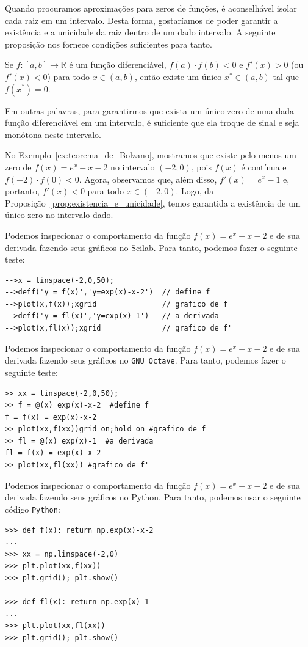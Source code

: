Quando procuramos aproximações para zeros de funções, é aconselhável isolar cada raiz em um intervalo. Desta forma, gostaríamos de poder garantir a existência e a unicidade da raiz dentro de um dado intervalo. A seguinte proposição nos fornece condições suficientes para tanto.

\begin{prop}\label{prop:existencia_e_unicidade}
Se $f:[a, b]\to\mathbb{R}$ é um função diferenciável, $f(a)\cdot f(b)<0$ e $f'(x)>0$ (ou $f'(x)<0$) para todo $x\in(a, b)$, então existe um único $x^*\in (a, b)$ tal que $f(x^*) = 0$.
\end{prop}

Em outras palavras, para garantirmos que exista um único zero de uma dada função diferenciável em um intervalo, é suficiente que ela troque de sinal e seja monótona neste intervalo.

\begin{ex}
No Exemplo~\ref{ex:teorema_de_Bolzano}, mostramos que existe pelo menos um zero de $f(x) = e^{x}-x-2$ no intervalo $(-2,0)$, pois $f(x)$ é contínua e $f(-2)\cdot f(0) < 0$. Agora, observamos que, além disso, $f'(x)=e^x-1$ e, portanto, $f'(x) < 0$ para todo $x\in(-2,0)$. Logo, da Proposição~\ref{prop:existencia_e_unicidade}, temos garantida a existência de um único zero no intervalo dado.

\ifisscilab
Podemos inspecionar o comportamento da função $f(x)= e^x - x - 2$ e de sua derivada fazendo seus gráficos no Scilab. Para tanto, podemos fazer o seguinte teste:
\begin{verbatim}
-->x = linspace(-2,0,50);
-->deff('y = f(x)','y=exp(x)-x-2')  // define f
-->plot(x,f(x));xgrid               // grafico de f
-->deff('y = fl(x)','y=exp(x)-1')   // a derivada
-->plot(x,fl(x));xgrid              // grafico de f'
\end{verbatim}
\fi
\ifisoctave
Podemos inspecionar o comportamento da função $f(x)= e^x - x - 2$ e de sua derivada fazendo seus gráficos no \verb+GNU Octave+. Para tanto, podemos fazer o seguinte teste:
\begin{verbatim}
>> xx = linspace(-2,0,50);
>> f = @(x) exp(x)-x-2  #define f
f = f(x) = exp(x)-x-2
>> plot(xx,f(xx))grid on;hold on #grafico de f
>> fl = @(x) exp(x)-1  #a derivada
fl = f(x) = exp(x)-x-2
>> plot(xx,fl(xx)) #grafico de f'
\end{verbatim}
\fi
\ifispython
Podemos inspecionar o comportamento da função $f(x)= e^x - x - 2$ e de sua derivada fazendo seus gráficos no Python. Para tanto, podemos usar o seguinte código \verb+Python+:
\begin{verbatim}
>>> def f(x): return np.exp(x)-x-2
... 
>>> xx = np.linspace(-2,0)
>>> plt.plot(xx,f(xx))
>>> plt.grid(); plt.show()

>>> def fl(x): return np.exp(x)-1
... 
>>> plt.plot(xx,fl(xx))
>>> plt.grid(); plt.show()
\end{verbatim}
\fi
\end{ex}

